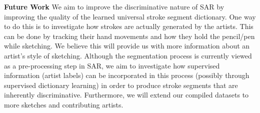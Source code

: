 %
%
%
%
%
%
%
\textbf{Future Work} We aim to improve the discriminative nature of SAR by improving the quality of the learned universal stroke segment dictionary. One way to do this is to investigate how strokes are actually generated by the artists. This can be done by tracking their hand movements and how they hold the pencil/pen while sketching. We believe this will provide us with more information about an artist's style of sketching. Although the segmentation process is currently viewed as a pre-processing step in SAR, we aim to investigate how supervised information (artist labels) can be incorporated in this process (possibly through supervised dictionary learning) in order to produce stroke segments that are inherently discriminative. Furthermore, we will extend our compiled datasets to more sketches and contributing artists.






